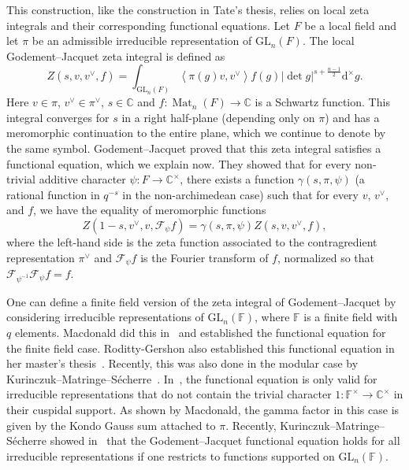 \documentclass[12pt, reqno]{amsart}
\theoremstyle{definition}
\newcommand{\cComplex}{\mathbb{C}}
\newcommand{\multiplicativegroup}[1]{#1^{\times}}
\newcommand{\innerproduct}[2]{\left\langle #1,#2\right\rangle}
\newcommand{\fieldCharacter}{\psi}
\newcommand{\GL}{\mathrm{GL}}
\newcommand{\finiteField}{\mathbb{F}}
\newcommand{\squareMatrix}{\operatorname{Mat}}
\newcommand{\fourierTransform}[1]{\mathcal{F}_{#1}}
\newcommand{\abs}[1]{\left|#1\right|}
\newcommand{\differential}{\mathrm{d}}
\newcommand{\mdifferential}{\differential^{\times}}
\begin{document}
This construction, like the construction in Tate's thesis, relies on local zeta integrals and their corresponding functional equations. Let $F$ be a local field and let $\pi$ be an admissible irreducible representation of $\GL_n\left(F\right)$. The local Godement--Jacquet zeta integral is defined as
\begin{displaymath}
Z\left(s,v,v^{\vee}, f\right) = \int_{\GL_n\left(F\right)} \innerproduct{\pi\left(g\right) v}{v^{\vee}}f\left(g\right) \abs{\det g}^{s + \frac{n-1}{2}} \mdifferential g.
\end{displaymath}
Here $v \in \pi$, $v^{\vee} \in \pi^{\vee}$, $s \in \cComplex$ and $f \colon \squareMatrix_n\left(F\right) \to \cComplex$ is a Schwartz function. This integral converges for $s$ in a right half-plane (depending only on $\pi$) and has a meromorphic continuation to the entire plane, which we continue to denote by the same symbol. Godement--Jacquet proved that this zeta integral satisfies a functional equation, which we explain now. They showed that for every non-trivial additive character $\fieldCharacter \colon F \to \multiplicativegroup{\cComplex}$, there exists a function $\gamma\left(s, \pi, \fieldCharacter\right)$ (a rational function in $q^{-s}$ in the non-archimedean case) such that for every $v$, $v^{\vee}$, and $f$, we have the equality of meromorphic functions
\begin{displaymath}
Z\left(1-s, v^{\vee}, v, \fourierTransform{\fieldCharacter} f\right) = \gamma\left(s, \pi, \fieldCharacter\right) Z\left(s, v, v^{\vee}, f\right),
\end{displaymath}
where the left-hand side is the zeta function associated to the contragredient representation $\pi^{\vee}$ and $\fourierTransform{\fieldCharacter}f$ is the Fourier transform of $f$, normalized so that $\fourierTransform{\fieldCharacter^{-1}} \fourierTransform{\fieldCharacter} f = f$.

One can define a finite field version of the zeta integral of Godement--Jacquet by considering irreducible representations of $\GL_n\left(\finiteField\right)$, where $\finiteField$ is a finite field with $q$ elements. Macdonald did this in~\cite{Macdonald80} and established the functional equation for the finite field case. Roditty-Gershon also established this functional equation in her master's thesis~\cite{RodittyGershon2010}. Recently, this was also done in the modular case by Kurinczuk--Matringe--S{\'e}cherre~\cite{KurinczukMatringeSecherre2026}. In~\cite{Macdonald80, RodittyGershon2010}, the functional equation is only valid for irreducible representations that do not contain the trivial character $1 \colon \multiplicativegroup{\finiteField} \to \multiplicativegroup{\cComplex}$ in their cuspidal support. As shown by Macdonald, the gamma factor in this case is given by the Kondo Gauss sum attached to $\pi$. Recently, Kurinczuk--Matringe--S{\'e}cherre showed in~\cite[Proposition 2.5]{KurinczukMatringeSecherre2026} that the Godement--Jacquet functional equation holds for all irreducible representations if one restricts to functions supported on $\GL_n\left(\finiteField\right)$.
\end{document}
